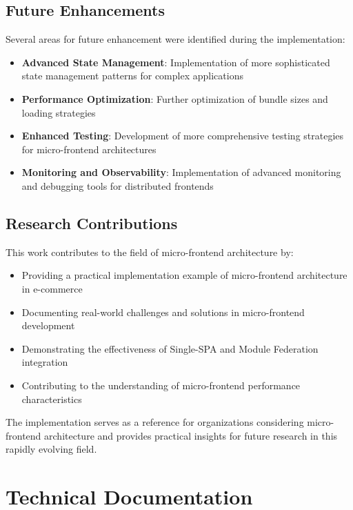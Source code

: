 \documentclass[12pt,a4paper]{report}
\begin{document}
\section{Future Enhancements}

Several areas for future enhancement were identified during the implementation:

\begin{itemize}
    \item \textbf{Advanced State Management}: Implementation of more sophisticated state management patterns for complex applications
    \item \textbf{Performance Optimization}: Further optimization of bundle sizes and loading strategies
    \item \textbf{Enhanced Testing}: Development of more comprehensive testing strategies for micro-frontend architectures
    \item \textbf{Monitoring and Observability}: Implementation of advanced monitoring and debugging tools for distributed frontends
\end{itemize}

\section{Research Contributions}

This work contributes to the field of micro-frontend architecture by:

\begin{itemize}
    \item Providing a practical implementation example of micro-frontend architecture in e-commerce
    \item Documenting real-world challenges and solutions in micro-frontend development
    \item Demonstrating the effectiveness of Single-SPA and Module Federation integration
    \item Contributing to the understanding of micro-frontend performance characteristics
\end{itemize}

The implementation serves as a reference for organizations considering micro-frontend architecture and provides practical insights for future research in this rapidly evolving field.




\appendix
\chapter{Technical Documentation}
\end{document}
